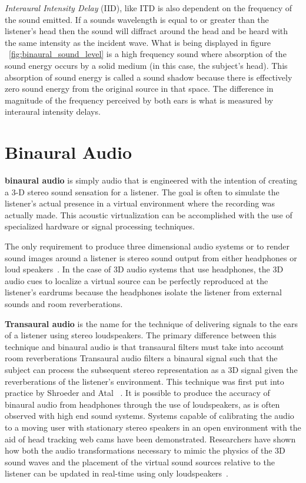\textit{Interaural Intensity Delay} (IID), like ITD is also dependent on the
frequency of the sound emitted. If a sounds wavelength is equal to or greater
than the listener's head then the sound will diffract around the head and be
heard with the same intensity as the incident wave. What is being displayed in
figure ~\ref{fig:binaural_sound_level} is a high frequency sound where
absorption of the sound energy occurs by a solid medium (in this case, the
subject's head). This absorption of sound energy is called a sound shadow
because there is effectively zero sound energy from the original source in that
space. The difference in magnitude of the frequency perceived by both ears is
what is measured by interaural intensity delays.


\section{                  Binaural Audio                                     }

\textbf{binaural audio} is simply audio that is engineered with the intention
of creating a 3-D stereo sound sensation for a listener. The goal is often to
simulate the listener's actual presence in a virtual environment where the
recording was actually made. This acoustic virtualization can be accomplished
with the use of specialized hardware or signal processing techniques.

The only requirement to produce three dimensional audio systems or to render
sound images around a listener is stereo sound output from either headphones
or loud speakers~\cite{thackara2005bubble}. In the case of 3D audio systems
that use headphones, the 3D audio cues to localize a virtual source can be
perfectly reproduced at the listener's eardrums because the headphones isolate
the listener from external sounds and room reverberations.

\textbf{Transaural audio} is the name for the technique of delivering signals to
the ears of a listener using stereo loudspeakers. The primary difference between
this technique and binaural audio is that transaural filters must take into
account room reverberations Transaural audio filters a binaural signal such
that the subject can process the subsequent stereo representation as a 3D signal
given the reverberations of the listener's environment. This technique was
first put into practice by Shroeder and Atal ~\cite{ schroeder1963computer,
schroeder1970digital }. It is possible to produce the accuracy of binaural audio
from headphones through the use of loudspeakers, as is often observed with high
end sound systems. Systems capable of calibrating the audio to a moving user
with stationary stereo speakers in an open environment with the aid of head
tracking web cams have been demonstrated. Researchers have shown how both the
audio transformations necessary to mimic the physics of the 3D sound waves and
the placement of the virtual sound sources relative to the listener can be
updated in real-time using only loudspeakers~\cite{song2010personal}.

